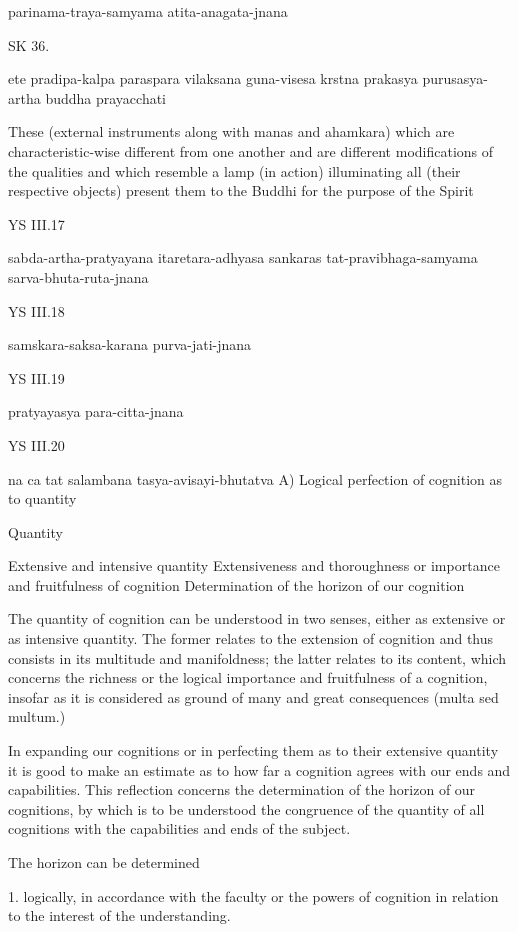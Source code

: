     parinama-traya-samyama atita-anagata-jnana


SK 36.

ete pradipa-kalpa paraspara vilaksana guna-visesa
krstna prakasya purusasya-artha buddha prayacchati

These (external instruments along with manas and ahamkara)
which are characteristic-wise different from one another
and are different modifications of the qualities
and which resemble a lamp (in action)
illuminating all (their respective objects)
present them to the Buddhi for the purpose of the Spirit

YS III.17

    sabda-artha-pratyayana itaretara-adhyasa sankaras
    tat-pravibhaga-samyama sarva-bhuta-ruta-jnana

YS III.18

    samskara-saksa-karana purva-jati-jnana

YS III.19

    pratyayasya para-citta-jnana

YS III.20

    na ca tat salambana tasya-avisayi-bhutatva
    A) Logical perfection of cognition as to quantity

    Quantity

        Extensive and intensive quantity
        Extensiveness and thoroughness
        or importance and fruitfulness of cognition
        Determination of the horizon of our cognition

    The quantity of cognition can be understood in two senses,
    either as extensive or as intensive quantity.
    The former relates to the extension of cognition and
    thus consists in its multitude and manifoldness;
    the latter relates to its content, which concerns the richness
    or the logical importance and fruitfulness of a cognition,
    insofar as it is considered as ground of
    many and great consequences (multa sed multum.)

    In expanding our cognitions or in perfecting them
    as to their extensive quantity
    it is good to make an estimate as to how far
    a cognition agrees with our ends and capabilities.
    This reflection concerns the determination of
    the horizon of our cognitions,
    by which is to be understood
    the congruence of the quantity of all cognitions
    with the capabilities and ends of the subject.

    The horizon can be determined

    1. logically, in accordance with the faculty or the powers of
    cognition in relation to the interest of the understanding.

